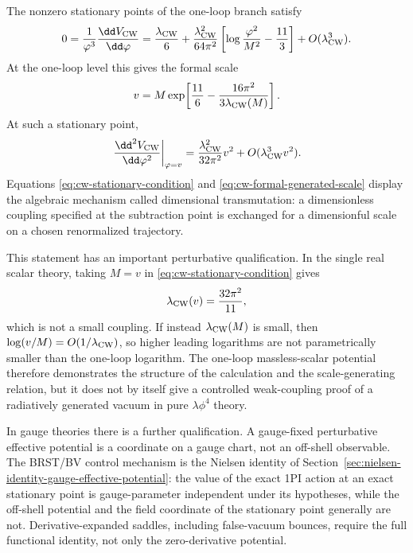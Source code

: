The nonzero stationary points of the one-loop branch satisfy
\begin{equation}
  0
  =
  \frac{1}{\varphi^3}\frac{\dd V_{\rm CW}}{\dd\varphi}
  =
  \frac{\lambda_{\rm CW}}{6}
  +
  \frac{\lambda_{\rm CW}^2}{64\pi^2}
  \left[
    \log\frac{\varphi^2}{M^2}
    -\frac{11}{3}
  \right]
  +O(\lambda_{\rm CW}^3).
  \label{eq:cw-stationary-condition}
\end{equation}
At the one-loop level this gives the formal scale
\begin{equation}
  v
  =
  M
  \exp\!\left[
    \frac{11}{6}
    -
    \frac{16\pi^2}{3\lambda_{\rm CW}(M)}
  \right].
  \label{eq:cw-formal-generated-scale}
\end{equation}
At such a stationary point,
\[
  \left.
  \frac{\dd^2V_{\rm CW}}{\dd\varphi^2}
  \right|_{\varphi=v}
  =
  \frac{\lambda_{\rm CW}^2}{32\pi^2}v^2+O(\lambda_{\rm CW}^3v^2).
\]
Equations \eqref{eq:cw-stationary-condition} and
\eqref{eq:cw-formal-generated-scale} display the algebraic mechanism called
dimensional transmutation: a dimensionless coupling specified at the
subtraction point is exchanged for a dimensionful scale on a chosen
renormalized trajectory.

This statement has an important perturbative qualification.  In the single
real scalar theory, taking \(M=v\) in
\eqref{eq:cw-stationary-condition} gives
\[
  \lambda_{\rm CW}(v)=\frac{32\pi^2}{11},
\]
which is not a small coupling.  If instead \(\lambda_{\rm CW}(M)\) is small,
then \(\log(v/M)=O(1/\lambda_{\rm CW})\), so higher leading logarithms are not
parametrically smaller than the one-loop logarithm.  The one-loop
massless-scalar potential therefore demonstrates the structure of the
calculation and the scale-generating relation, but it does not by itself give
a controlled weak-coupling proof of a radiatively generated vacuum in pure
\(\lambda\phi^4\) theory.

In gauge theories there is a further qualification.  A gauge-fixed
perturbative effective potential is a coordinate on a gauge chart, not an
off-shell observable.  The BRST/BV control mechanism is the Nielsen identity
of Section~\ref{sec:nielsen-identity-gauge-effective-potential}: the value of
the exact 1PI action at an exact stationary point is gauge-parameter
independent under its hypotheses, while the off-shell potential and the field
coordinate of the stationary point generally are not.  Derivative-expanded
saddles, including false-vacuum bounces, require the full functional identity,
not only the zero-derivative potential.

